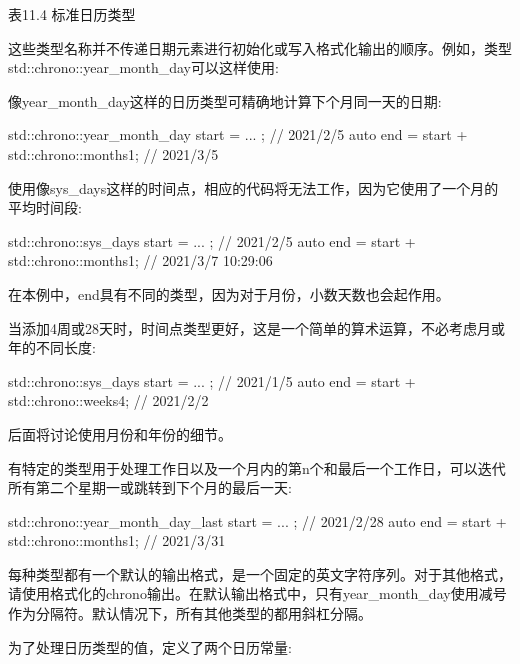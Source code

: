 \begin{center}
表11.4 标准日历类型
\end{center}

这些类型名称并不传递日期元素进行初始化或写入格式化输出的顺序。例如，类型std::chrono::year\_month\_day可以这样使用:


像year\_month\_day这样的日历类型可精确地计算下个月同一天的日期:

\begin{cpp}
std::chrono::year_month_day start = ... ; // 2021/2/5
auto end = start + std::chrono::months{1}; // 2021/3/5
\end{cpp}

使用像sys\_days这样的时间点，相应的代码将无法工作，因为它使用了一个月的平均时间段:

\begin{cpp}
std::chrono::sys_days start = ... ; // 2021/2/5
auto end = start + std::chrono::months{1}; // 2021/3/7 10:29:06
\end{cpp}

在本例中，end具有不同的类型，因为对于月份，小数天数也会起作用。

当添加4周或28天时，时间点类型更好，这是一个简单的算术运算，不必考虑月或年的不同长度:

\begin{cpp}
std::chrono::sys_days start = ... ; // 2021/1/5
auto end = start + std::chrono::weeks{4}; // 2021/2/2
\end{cpp}

后面将讨论使用月份和年份的细节。

有特定的类型用于处理工作日以及一个月内的第n个和最后一个工作日，可以迭代所有第二个星期一或跳转到下个月的最后一天:

\begin{cpp}
std::chrono::year_month_day_last start = ... ; // 2021/2/28
auto end = start + std::chrono::months{1}; // 2021/3/31
\end{cpp}

每种类型都有一个默认的输出格式，是一个固定的英文字符序列。对于其他格式，请使用格式化的chrono输出。在默认输出格式中，只有year\_month\_day使用减号作为分隔符。默认情况下，所有其他类型的都用斜杠分隔。

为了处理日历类型的值，定义了两个日历常量:


